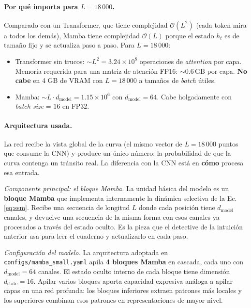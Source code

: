 \documentclass[11pt,a4paper]{article}
\begin{document}
\paragraph{Por qué importa para $L=18\,000$.}
Comparado con un Transformer, que tiene complejidad $\mathcal{O}(L^2)$
(cada token mira a todos los demás), Mamba tiene complejidad
$\mathcal{O}(L)$ porque el estado $h_t$ es de tamaño fijo y se
actualiza paso a paso. Para $L = 18\,000$:
\begin{itemize}
  \item Transformer sin trucos: $\sim L^2 = 3.24 \times 10^8$
    operaciones de \textit{attention} por capa. Memoria requerida
    para una matriz de atención FP16: $\sim 0.6\,\text{GB}$ por capa.
    \textbf{No cabe} en 4 GB de VRAM con $L = 18\,000$ a tamaños de
    \textit{batch} útiles.
  \item Mamba: $\sim L \cdot d_{\text{model}} = 1.15 \times 10^6$
    con $d_{\text{model}} = 64$. Cabe holgadamente con
    \textit{batch size} = 16 en FP32.
\end{itemize}

\paragraph{Arquitectura usada.}
La red recibe la vista global de la curva (el mismo vector de
$L = 18\,000$ puntos que consume la CNN) y produce un único número:
la probabilidad de que la curva contenga un tránsito real. La
diferencia con la CNN está en \textbf{cómo} procesa esa entrada.

\emph{Componente principal: el bloque Mamba.}
La unidad básica del modelo es un \textbf{bloque Mamba} que
implementa internamente la dinámica selectiva de la
Ec.\ref{eq:ssm}. Recibe una secuencia de longitud $L$ donde cada
posición tiene $d_{\text{model}}$ canales, y devuelve una secuencia
de la misma forma con esos canales ya procesados a través del estado
oculto. Es la pieza que el detective de la intuición anterior usa
para leer el cuaderno y actualizarlo en cada paso.

\emph{Configuración del modelo.}
La arquitectura adoptada en \texttt{configs/mamba\_small.yaml} apila
\textbf{4 bloques Mamba} en cascada, cada uno con
$d_{\text{model}} = 64$ canales. El estado oculto interno de cada
bloque tiene dimensión $d_{\text{state}} = 16$. Apilar varios
bloques aporta capacidad expresiva análoga a apilar capas en una
red profunda: los bloques inferiores extraen patrones más locales y
los superiores combinan esos patrones en representaciones de mayor
nivel.
\end{document}
